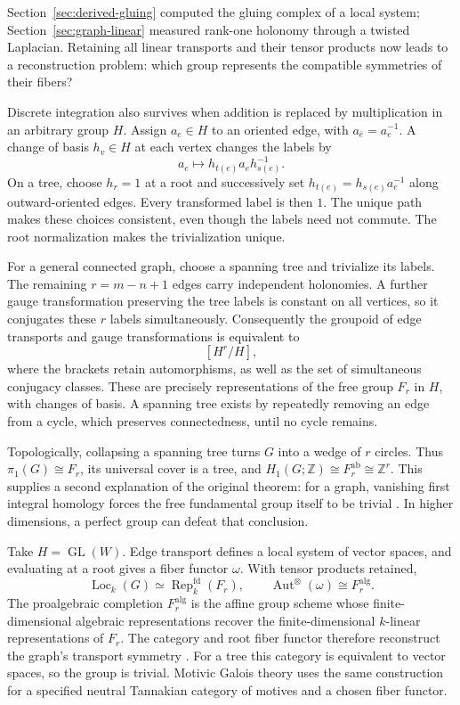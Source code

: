 \documentclass[11pt]{article}
\theoremstyle{definition}
\theoremstyle{remark}
\newcommand{\Z}{\mathbb Z}
\begin{document}
Section~\ref{sec:derived-gluing} computed the gluing complex of a local system; Section~\ref{sec:graph-linear} measured rank-one holonomy through a twisted Laplacian. Retaining all linear transports and their tensor products now leads to a reconstruction problem: which group represents the compatible symmetries of their fibers?

Discrete integration also survives when addition is replaced by multiplication in an arbitrary group \(H\). Assign \(a_e\in H\) to an oriented edge, with \(a_{\bar e}=a_e^{-1}\). A change of basis \(h_v\in H\) at each vertex changes the labels by
\[
 a_e\longmapsto h_{t(e)}a_eh_{s(e)}^{-1}.
\]
On a tree, choose \(h_r=1\) at a root and successively set
\(h_{t(e)}=h_{s(e)}a_e^{-1}\) along outward-oriented edges. Every transformed label is then \(1\). The unique path makes these choices consistent, even though the labels need not commute. The root normalization makes the trivialization unique.

For a general connected graph, choose a spanning tree and trivialize its labels. The remaining \(r=m-n+1\) edges carry independent holonomies. A further gauge transformation preserving the tree labels is constant on all vertices, so it conjugates these \(r\) labels simultaneously. Consequently the groupoid of edge transports and gauge transformations is equivalent to
\[
 [H^r/H],
\]
where the brackets retain automorphisms, as well as the set of simultaneous conjugacy classes. These are precisely representations of the free group \(F_r\) in \(H\), with changes of basis. A spanning tree exists by repeatedly removing an edge from a cycle, which preserves connectedness, until no cycle remains.

Topologically, collapsing a spanning tree turns \(G\) into a wedge of \(r\) circles. Thus \(\pi_1(G)\cong F_r\), its universal cover is a tree, and
\(H_1(G;\Z)\cong F_r^{\mathrm{ab}}\cong\Z^r\). This supplies a second explanation of the original theorem: for a graph, vanishing first integral homology forces the free fundamental group itself to be trivial \cite{rootHatcher}. In higher dimensions, a perfect group can defeat that conclusion.

Take \(H=\operatorname{GL}(W)\). Edge transport defines a local system of vector spaces, and evaluating at a root gives a fiber functor \(\omega\). With tensor products retained,
\[
 \operatorname{Loc}_k(G)\simeq\operatorname{Rep}^{\mathrm{fd}}_k(F_r),
 \qquad
 \operatorname{Aut}^{\otimes}(\omega)\cong F_r^{\mathrm{alg}}.
\]
The proalgebraic completion \(F_r^{\mathrm{alg}}\) is the affine group scheme whose finite-dimensional algebraic representations recover the finite-dimensional \(k\)-linear representations of \(F_r\). The category and root fiber functor therefore reconstruct the graph's transport symmetry \cite{rootMilne,rootDeninger}. For a tree this category is equivalent to vector spaces, so the group is trivial. Motivic Galois theory uses the same construction for a specified neutral Tannakian category of motives and a chosen fiber functor.
\end{document}
